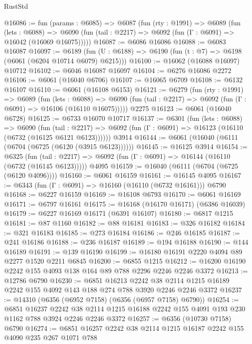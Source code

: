 \begin{lexlean}{RustStd}
\begin{coremodule}
@16086 := fun (params : @6085) =>
  @6087
    (fun (rty : @1991) =>
    @6089
      (fun (lets : @6088) =>
      @6090 (fun (tail : @2217) => @6092 (fun (Γ : @6091) => @16042 (@16069 @16075)))))
@16087 := @6086 @16086
@16088 := @6083 @16087
@16097 := @6189
    (fun (U : @6188) => @6190 (fun (t : @7) => @6198 (@6061 (@6204 @10714 @6079) @6215)))
@16100 := @16062 (@16088 @16097) @10712
@16102 := @6046 @16087 @16097
@16104 := @6276 @16086 @2272
@16106 := @6061 (@16040 @6706)
@16107 := @16065 @6709
@16108 := @6132 @16107
@16110 := @6061 (@16108 @6153)
@16121 := @6279
    (fun (rty : @1991) =>
    @6089
      (fun (lets : @6088) =>
      @6090 (fun (tail : @2217) => @6092 (fun (Γ : @6091) => @16106 (@16110 @16075)))))
    @2275
@16123 := @6061 (@16040 @6728)
@16125 := @6733 @16070 @10717
@16137 := @6301
    (fun (lets : @6088) =>
    @6090
      (fun (tail : @2217) =>
      @6092 (fun (Γ : @6091) => @16123 (@16110 (@6732 (@16125 @6121 @6123))))))
    @3914
@16144 := @6061 (@16040 (@6111 (@6704 (@6725 (@6120 (@3915 @6123))))))
@16145 := @16125 @3914
@16154 := @6325
    (fun (tail : @2217) => @6092 (fun (Γ : @6091) => @16144 (@16110 (@6732 (@16145 @6123)))))
    @4095
@16159 := @16040 (@6111 (@6704 (@6725 (@6120 @4096))))
@16160 := @6061 @16159
@16161 := @16145 @4095
@16167 := @6343 (fun (Γ : @6091) => @16160 (@16110 (@6732 @16161))) @6790
@16168 := @6227 @16159
@16169 := @16108 @6793
@16170 := @6061 @16169
@16171 := @6797 @16161
@16175 := @16168 (@16170 @16171) (@6386 @16039)
@16179 := @6227 @16169 @16171 (@6391 @16107)
@16180 := @6817 @1215
@16181 := @87 @1160
@16182 := @88 @16181
@16183 := @326 @16182
@16184 := @321 @16183
@16185 := @273 @16184
@16186 := @246 @16185
@16187 := @241 @16186
@16188 := @236 @16187
@16189 := @194 @16188
@16190 := @144 @16189
@16191 := @139 @16190
@16199 := @16180 @16191 @2220 @4094 @89 @2277 @1520 @2211 @6845
@16200 := @6855 @1215
@16212 := @16200 @16190 @2242 @155 @4093 @138 @164 @89 @788 @2296 @2246 @2246 @3372
@16213 := @12786 @6790
@16230 := @6851
    @16213
    @2242
    @38
    @2114
    @1215
    @16189
    @2242
    @155
    @4092
    @143
    @188
    @274
    @788
    @3920
    @2246
    @2246
    @3372
@16237 := @14310 (@6356 (@6952 @7158) (@6356 (@6957 @7158) @6790))
@16254 := @6851
    @16237
    @2242
    @38
    @2114
    @1215
    @16188
    @2242
    @155
    @4091
    @193
    @230
    @1162
    @788
    @3924
    @2246
    @2246
    @3372
@16257 := @6356 (@10730 @7158) @6790
@16274 := @6851
    @16257
    @2242
    @38
    @2114
    @1215
    @16187
    @2242
    @155
    @4090
    @235
    @267
    @1071
    @788

\end{coremodule}
\end{lexlean}
